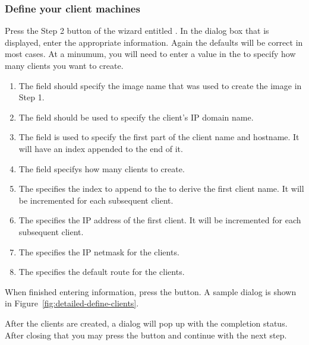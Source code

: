\subsubsection{Define your client machines} 
\label{det:defclients}

Press the Step 2 button of the wizard entitled . In the dialog box that is displayed, enter the
appropriate information. Again the defaults will be correct in most
cases. At a minumum, you will need to enter a value in the 
to specify how many clients you want to create.

\begin{enumerate}

\item The  field should specify the image name that was used to 
create the image in Step 1.

\item The  field should be used to specify the client's IP
domain name.

\item The  field is used to specify the first part of the 
client name and hostname. It will have an index appended to the end of it.

\item The  field specifys how many clients to create.

\item The  specifies the index to append
to the  to derive the first client name. It will be incremented
for each subsequent client.

\item The  specifies the IP address of the first client. It 
will be incremented for each subsequent client.

\item The  specifies the IP netmask for the clients.

\item The  specifies the default route for the clients.

\end{enumerate}
  
When finished entering information, press the  button.
A sample dialog is shown in Figure~\ref{fig:detailed-define-clients}. 

After the clients are created,
a dialog will pop up with the completion status. After closing that 
you may press the  button and continue with the next step.

